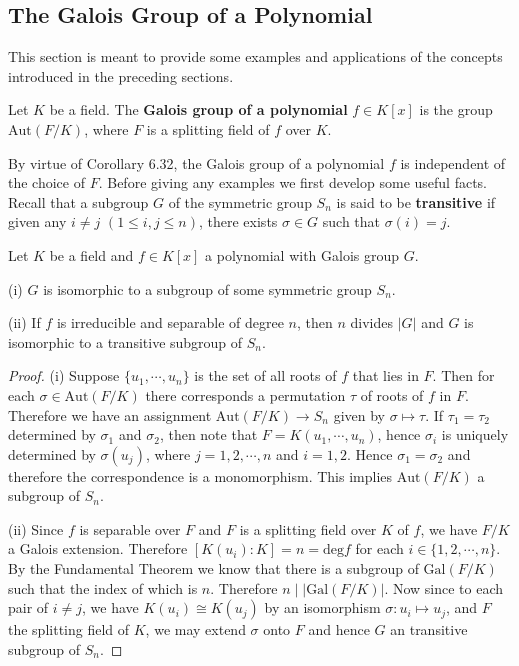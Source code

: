\subsection{The Galois Group of a Polynomial}
This section is meant to provide some examples and applications of the concepts introduced in the preceding sections.
\begin{definition}
Let $K$ be a field. The \textbf{Galois group of a polynomial} $f\in K[x]$ is the group $\mathrm{Aut}(F/K)$, where $F$ is a splitting field of $f$ over $K$.
\end{definition}
By virtue of Corollary 6.32, the Galois group of a polynomial $f$ is independent of the choice of $F$. Before giving any examples we first develop some useful facts. Recall that a subgroup $G$ of the symmetric group $S_n$ is said to be \textbf{transitive} if given any $i\ne j$ $(1\le i,j\le n)$, there exists $\sigma\in G$ such that $\sigma(i)=j$.
\begin{theorem}
Let $K$ be a field and $f\in K[x]$ a polynomial with Galois group $G$.\par
(i) $G$ is isomorphic to a subgroup of some symmetric group $S_n$.\par
(ii) If $f$ is irreducible and separable of degree $n$, then $n$ divides $|G|$ and $G$ is isomorphic to a transitive subgroup of $S_n$.
\end{theorem}
\begin{proof}
(i) Suppose $\{u_1,\cdots,u_n\}$ is the set of all roots of $f$ that lies in $F$. Then for each $\sigma\in\mathrm{Aut}(F/K)$ there corresponds a permutation $\tau$ of roots of $f$ in $F$. Therefore we have an assignment $\mathrm{Aut}(F/K)\to S_n$ given by $\sigma\mapsto\tau$. If $\tau_1=\tau_2$ determined by $\sigma_1$ and $\sigma_2$, then note that $F=K(u_1,\cdots,u_n)$, hence $\sigma_i$ is uniquely determined by $\sigma(u_j)$, where $j=1,2,\cdots,n$ and $i=1,2$. Hence $\sigma_1=\sigma_2$ and therefore the correspondence is a monomorphism. This implies $\mathrm{Aut}(F/K)$ a subgroup of $S_n$.\par
(ii) Since $f$ is separable over $F$ and $F$ is a splitting field over $K$ of $f$, we have $F/K$ a Galois extension. Therefore $[K(u_i):K]=n=\mathrm{deg}f$ for each $i\in\{1,2,\cdots,n\}$. By the Fundamental Theorem we know that there is a subgroup of $\mathrm{Gal}(F/K)$ such that the index of which is $n$. Therefore $n\mid|\mathrm{Gal}(F/K)|$. Now since to each pair of $i\ne j$, we have $K(u_i)\cong K(u_j)$ by an isomorphism $\sigma:u_i\mapsto u_j$, and $F$ the splitting field of $K$, we may extend $\sigma$ onto $F$ and hence $G$ an transitive subgroup of $S_n$.
\end{proof}
